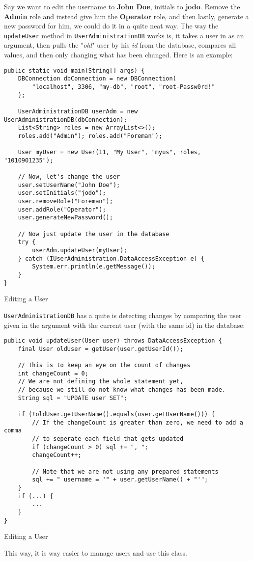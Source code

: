 Say we want to edit the username to \textbf{John Doe}, initials to \textbf{jodo}. Remove the \textbf{Admin} role and instead give him the \textbf{Operator} role, and then lastly, generate a new password for him, we could do it in a quite neat way. The way the \texttt{updateUser} method in \texttt{UserAdministrationDB} works is, it takes a user in as an argument, then pulls the "\textit{old}" user by his \textit{id} from the database, compares all values, and then only changing what has been changed. Here is an example:

\begin{listing}[ht]
\begin{verbatim}
public static void main(String[] args) {
    DBConnection dbConnection = new DBConnection(
        "localhost", 3306, "my-db", "root", "root-Passw0rd!"
    );
    
    UserAdministrationDB userAdm = new UserAdministrationDB(dbConnection);
    List<String> roles = new ArrayList<>();
    roles.add("Admin"); roles.add("Foreman");
    
    User myUser = new User(11, "My User", "myus", roles, "1010901235");
    
    // Now, let's change the user
    user.setUserName("John Doe");
    user.setInitials("jodo");
    user.removeRole("Foreman");
    user.addRole("Operator");
    user.generateNewPassword();
    
    // Now just update the user in the database
    try {
        userAdm.updateUser(myUser); 
    } catch (IUserAdministration.DataAccessException e) {
        System.err.println(e.getMessage());
    }
}
\end{verbatim}
\caption{Editing a User}
\label{listing:4}
\end{listing}

\texttt{UserAdministrationDB} has a quite is detecting changes by comparing the user given in the argument with the current user (with the same id) in the database:

\begin{listing}[ht]
\begin{verbatim}
public void updateUser(User user) throws DataAccessException {
    final User oldUser = getUser(user.getUserId());
    
    // This is to keep an eye on the count of changes
    int changeCount = 0;
    // We are not defining the whole statement yet, 
    // because we still do not know what changes has been made.
    String sql = "UPDATE user SET";
    
    if (!oldUser.getUserName().equals(user.getUserName())) {
        // If the changeCount is greater than zero, we need to add a comma
        // to seperate each field that gets updated
        if (changeCount > 0) sql += ", ";
        changeCount++;
        
        // Note that we are not using any prepared statements
        sql += " username = '" + user.getUserName() + "'";
    }
    if (...) {
        ...
    }    
}
\end{verbatim}
\caption{Editing a User}
\label{listing:4}
\end{listing}

This way, it is way easier to manage users and use this class.